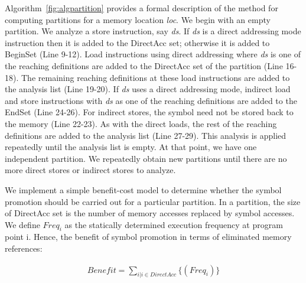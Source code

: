 

%

Algorithm~\ref{fig:algpartition} provides a formal description of the method for computing partitions for a memory location \emph{loc}. We begin with an empty partition. We analyze a store instruction, say \emph{ds}. If \emph{ds} is a direct addressing mode instruction then it is added to the DirectAcc set; otherwise it is added to BeginSet (Line 9-12). Load instructions using direct addressing where \emph{ds} is one of the reaching definitions are added to the DirectAcc set of the partition (Line 16-18). The remaining reaching definitions at these load instructions are added to the analysis list (Line 19-20). If \emph{ds} uses a direct addressing mode, indirect load and store instructions with \emph{ds} as one of the reaching definitions are added to the EndSet (Line 24-26). For indirect stores, the symbol need not be stored back to the memory (Line 22-23). As with the direct loads, the rest of the reaching definitions are added to the analysis list (Line 27-29). This analysis is applied repeatedly until the analysis list is empty. At that point, we have one independent partition. We repeatedly obtain new partitions until there are no more direct stores or indirect stores to analyze. 

We implement a simple benefit-cost model to determine whether the symbol promotion should be carried out for a particular partition. In a partition, the size of DirectAcc set is the number of memory accesses replaced by symbol accesses. We define $Freq_{i}$ as the statically determined execution frequency at program point i. Hence, the benefit of symbol promotion in terms of eliminated memory references:

{\begin{scriptsize}
\begin{equation} 
\begin{split}
Benefit= \sum_{i | i \in DirectAcc}\{ (Freq_{i})\} 
\end{split}
\end{equation} 
\end{scriptsize}}

